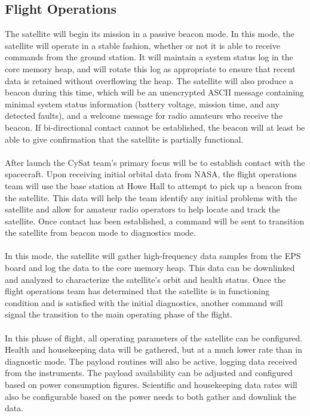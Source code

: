 \documentclass[nocover]            %
{CSLI}                       %
\begin{document}
\subsection{Flight Operations}
The satellite will begin its mission in a passive beacon mode. In this mode, the satellite will operate in a stable fashion, whether or not it is able to receive commands from the ground station. It will maintain a system status log in the core memory heap, and will rotate this log as appropriate to ensure that recent data is retained without overflowing the heap. The satellite will also produce a beacon during this time, which will be an unencrypted ASCII message containing minimal system status information (battery voltage, mission time, and any detected faults), and a welcome message for radio amateurs who receive the beacon. If bi-directional contact cannot be established, the beacon will at least be able to give confirmation that the satellite is partially functional.\\
\\After launch the CySat team's primary focus will be to establish contact with the spacecraft. Upon receiving initial orbital data from NASA, the flight operations team will use the base station at Howe Hall to attempt to pick up a beacon from the satellite. This data will help the team identify any initial problems with the satellite and allow for amateur radio operators to help locate and track the satellite. Once contact has been established, a command will be sent to transition the satellite from beacon mode to diagnostics mode.\\
\\In this mode, the satellite will gather high-frequency data samples from the EPS board and log the data to the core memory heap. This data can be downlinked and analyzed to characterize the satellite's orbit and health status. Once the flight operations team has determined that the satellite is in functioning condition and is satisfied with the initial diagnostics, another command will signal the transition to the main operating phase of the flight.\\
\\In this phase of flight, all operating parameters of the satellite can be configured. Health and housekeeping data will be gathered, but at a much lower rate than in diagnostic mode. The payload routines will also be active, logging data received from the instruments. The payload availability can be adjusted and configured based on power consumption figures. Scientific and housekeeping data rates will also be configurable based on the power needs to both gather and downlink the data.\\ 
\end{document}
